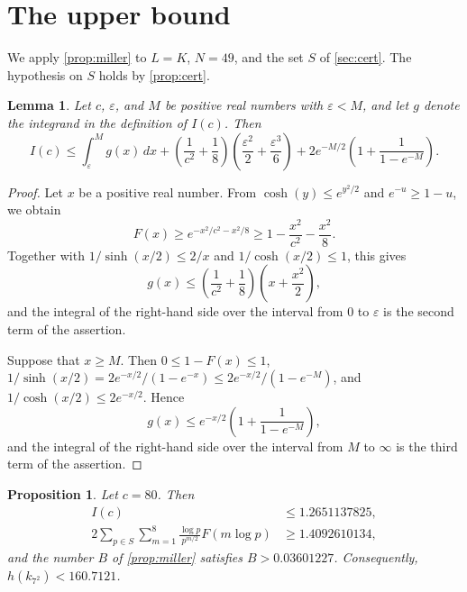 \documentclass[11pt]{amsart}
\theoremstyle{plain}
\newtheorem{proposition}[theorem]{Proposition}
\newtheorem{lemma}[theorem]{Lemma}
\theoremstyle{definition}
\begin{document}
\section{The upper bound} \label{sec:bound}

We apply \cref{prop:miller} to $L = K$, $N = 49$, and the set $S$ of \cref{sec:cert}.
The hypothesis on $S$ holds by \cref{prop:cert}.

\begin{lemma} \label{lem:integral}
Let $c$, $\varepsilon$, and $M$ be positive real numbers with $\varepsilon < M$, and let $g$ denote the integrand in the definition of $I(c)$.
Then
\[
I(c) \le \int_\varepsilon^M g(x)\, dx + \left( \frac{1}{c^2} + \frac{1}{8} \right) \left( \frac{\varepsilon^2}{2} + \frac{\varepsilon^3}{6} \right) + 2 e^{-M/2} \left( 1 + \frac{1}{1 - e^{-M}} \right).
\]
\end{lemma}

\begin{proof}
Let $x$ be a positive real number.
From $\cosh(y) \le e^{y^2/2}$ and $e^{-u} \ge 1 - u$, we obtain
\[
F(x) \ge e^{-x^2/c^2 - x^2/8} \ge 1 - \frac{x^2}{c^2} - \frac{x^2}{8} .
\]
Together with $1/\sinh(x/2) \le 2/x$ and $1/\cosh(x/2) \le 1$, this gives
\[
g(x) \le \left( \frac{1}{c^2} + \frac{1}{8} \right) \left( x + \frac{x^2}{2} \right),
\]
and the integral of the right-hand side over the interval from $0$ to $\varepsilon$ is the second term of the assertion.

Suppose that $x \ge M$.
Then $0 \le 1 - F(x) \le 1$, $1/\sinh(x/2) = 2e^{-x/2}/(1 - e^{-x}) \le 2e^{-x/2}/(1 - e^{-M})$, and $1/\cosh(x/2) \le 2e^{-x/2}$.
Hence
\[
g(x) \le e^{-x/2} \left( 1 + \frac{1}{1 - e^{-M}} \right),
\]
and the integral of the right-hand side over the interval from $M$ to $\infty$ is the third term of the assertion.
\end{proof}

\begin{proposition} \label{prop:bound}
Let $c = 80$. Then
\begin{align*}
I(c) &\le 1.2651137825, \\
2 \sum_{p \in S} \sum_{m=1}^{8} \frac{\log p}{p^{m/2}} F(m \log p) &\ge 1.4092610134,
\end{align*}
and the number $B$ of \cref{prop:miller} satisfies $B > 0.03601227$.
Consequently, $h(k_{7^2}) < 160.7121$.
\end{proposition}
\end{document}
